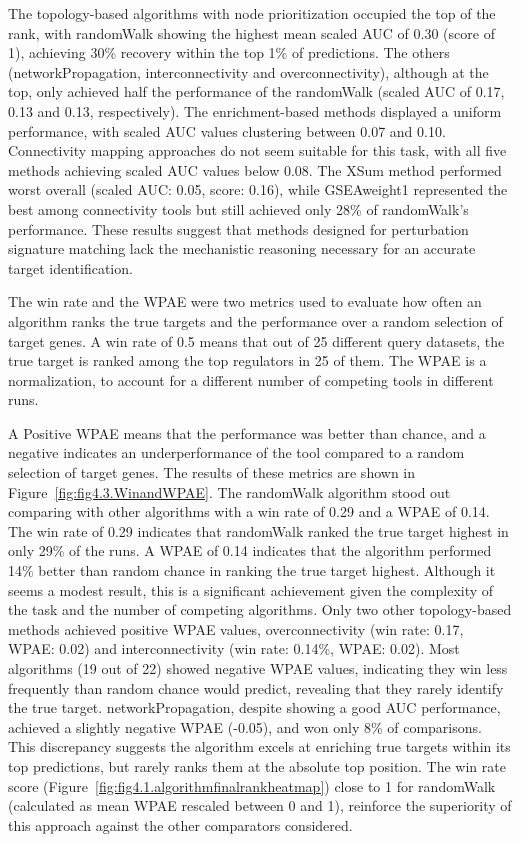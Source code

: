 The topology-based algorithms with node prioritization occupied the top of the rank, with randomWalk showing the highest mean scaled \gls{AUC} of 0.30 (score of 1), achieving 30\% recovery within the top 1\% of predictions.
The others (networkPropagation, interconnectivity and overconnectivity), although at the top, only achieved half the performance of the randomWalk (scaled \gls{AUC} of 0.17, 0.13 and 0.13, respectively).
The enrichment-based methods displayed a uniform performance, with scaled \gls{AUC} values clustering between 0.07 and 0.10.
Connectivity mapping approaches do not seem suitable for this task, with all five methods achieving scaled \gls{AUC} values below 0.08.
The XSum method performed worst overall (scaled \gls{AUC}: 0.05, score: 0.16), while GSEAweight1 represented the best among connectivity tools but still achieved only 28\% of randomWalk's performance.
These results suggest that methods designed for perturbation signature matching lack the mechanistic reasoning necessary for an accurate target identification.

The win rate and the \gls{WPAE} were two metrics used to evaluate how often an algorithm ranks the true targets and the performance over a random selection of target genes.
A win rate of 0.5 means that out of 25 different query datasets, the true target is ranked among the top regulators in 25 of them.
The \gls{WPAE} is a normalization, to account for a different number of competing tools in different runs.

A Positive \gls{WPAE} means that the performance was better than chance, and a negative indicates an underperformance of the tool compared to a random selection of target genes.
The results of these metrics are shown in Figure~\ref{fig:fig4.3.WinandWPAE}.
The randomWalk algorithm stood out comparing with other algorithms with a win rate of 0.29 and a \gls{WPAE} of 0.14.
The win rate of 0.29 indicates that randomWalk ranked the true target highest in only 29\% of the runs.
A \gls{WPAE} of 0.14 indicates that the algorithm performed 14\% better than random chance in ranking the true target highest.
Although it seems a modest result, this is a significant achievement given the complexity of the task and the number of competing algorithms.
Only two other topology-based methods achieved positive WPAE values, overconnectivity (win rate: 0.17, WPAE: 0.02) and interconnectivity (win rate: 0.14\%, \gls{WPAE}: 0.02).
Most algorithms (19 out of 22) showed negative \gls{WPAE} values, indicating they win less frequently than random chance would predict, revealing that they rarely identify the true target.
networkPropagation, despite showing a good \gls{AUC} performance, achieved a slightly negative \gls{WPAE} (-0.05), and won only 8\% of comparisons.
This discrepancy suggests the algorithm excels at enriching true targets within its top predictions, but rarely ranks them at the absolute top position.
The win rate score (Figure~\ref{fig:fig4.1.algorithmfinalrankheatmap}) close to 1 for randomWalk (calculated as mean \gls{WPAE} rescaled between 0 and 1), reinforce the superiority of this approach against the other comparators considered.

